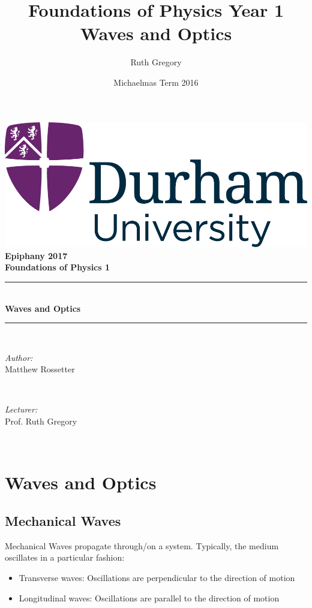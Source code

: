 \documentclass[a4paper, 11pt, normalem]{report}
\title{Foundations of Physics Year 1 \\ Waves and Optics \vspace{-20pt}}
\author{Ruth Gregory}
\date{\vspace{-15pt}Michaelmas Term 2016}
\begin{document}
\begin{titlepage}
    \newcommand{\HRule}{\rule{\linewidth}{0.5mm}}
    \center
    {\includegraphics[scale=0.5]{../../logo0.png}\hfill{\Large\bfseries Epiphany 2017}}\\[2.5cm]
    {\LARGE\bfseries Foundations of Physics 1}\\[1.5cm]
    \HRule \\[0.7cm]
    {\huge\bfseries Waves and Optics}\\[0.4cm]
    \HRule \\[1.5cm]

    \begin{minipage}{0.4\textwidth}
        \begin{flushleft} \large
            \emph{Author:} \\ Matthew Rossetter
        \end{flushleft}
    \end{minipage}~
    \begin{minipage}{0.4\textwidth}
        \begin{flushright} \large
            \emph{Lecturer:} \\ Prof. Ruth Gregory
        \end{flushright}
    \end{minipage}\\[2cm]
    \vfill
\end{titlepage}

\chapter{Waves and Optics}
\section{Mechanical Waves}
Mechanical Waves propagate through/on a system.
Typically, the medium oscillates in a particular fashion:
\begin{itemize}
    \item Transverse waves: Oscillations are perpendicular to the direction of motion
    \item Longitudinal waves: Oscillations are parallel to the direction of motion
\end{itemize}
\end{document}
